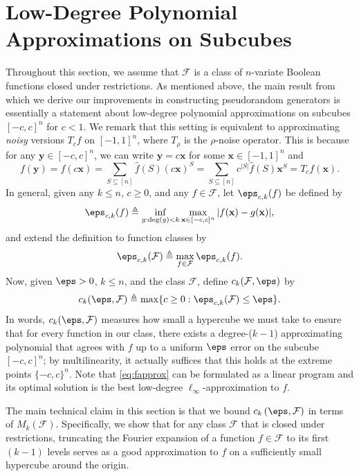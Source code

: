 \setcounter{theorem}{16}\section{Low-Degree Polynomial Approximations on Subcubes}
\label{sec:lowdeg}

Throughout this section, we assume that $\mathcal{F}$ is a class of $n$-variate Boolean functions closed under restrictions.  As mentioned above, the main result from which we derive our improvements in constructing pseudorandom generators is essentially a statement about low-degree polynomial approximations on subcubes $[-c,c]^n$ for $c<1$.   We remark that this setting is equivalent to approximating \emph{noisy} versions $T_cf$ on $[-1,1]^n$, where $T_{\rho}$ is the $\rho$-noise operator.  This is because for any $\mathbf{y} \in [-c,c]^n$, we can write $\mathbf{y} = c\mathbf{x}$ for some $\mathbf{x} \in [-1,1]^n$ and
\[
f(\mathbf{y})
=f(c\mathbf{x})
= \sum_{S \subseteq [n]} \hat{f}(S) (c\mathbf{x})^S
= \sum_{S \subseteq [n]} c^{|S|} \hat{f}(S) \mathbf{x}^S
= T_cf(\mathbf{x}) .
\]
In general, given any $k\leq n$, $c\geq 0$, and any $f\in \mathcal{F}$, let $\eps_{c,k}(f)$ be defined by
\begin{equation}
\label{eq:fapprox}
    \eps_{c,k}(f) \triangleq \inf_{g: \mathrm{deg}(g)< k}\max_{\mathbf{x}\in [-c,c]^n}  \vert f(\mathbf{x})-g(\mathbf{x})\vert,
\end{equation}
and extend the definition to function classes by
\begin{equation*}
    \eps_{c,k}(\mathcal{F}) \triangleq \max_{f\in \mathcal{F}} \eps_{c,k}(f).
\end{equation*}
Now, given $\eps>0$, $k\leq n$, and the class $\mathcal{F}$, define $c_k(\mathcal{F},\eps)$ by
\begin{equation*}
    c_k(\eps,\mathcal{F})\triangleq \max\{ c\geq 0: \eps_{c,k}(\mathcal{F})\leq \eps\}.
\end{equation*}
In words, $c_k(\eps,\mathcal{F})$ measures how small a hypercube we must take to ensure that for every function in our class, there exists a degree-($k-1$) approximating polynomial that agrees with $f$ up to a uniform $\eps$ error on the subcube $[-c,c]^n$; by multilinearity, it actually suffices that this holds at the extreme points $\{-c,c\}^n$. Note that \cref{eq:fapprox} can be formulated as a linear program and its optimal solution is the best low-degree  $\ell_{\infty}$-approximation to $f$.


The main technical claim in this section is that we bound $c_k \left( \eps , \mathcal{F} \right)$ in terms of $M_k(\mathcal{F})$.  Specifically, we show that for any class $\mathcal{F}$ that is closed under restrictions, truncating the Fourier expansion of a function $f \in \mathcal{F}$ to its first $(k-1)$ levels serves as a good approximation to $f$ on a sufficiently small hypercube around the origin.

